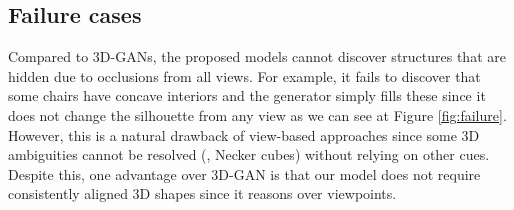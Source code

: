 \subsection{Failure cases} 
Compared to 3D-GANs, the proposed \prgan models cannot discover structures that are hidden
due to occlusions from all views. For example, it fails to discover that some chairs have concave interiors and the generator simply fills these since it does not change the silhouette from any view as we can see at Figure
\ref{fig:failure}. 
However, this is a natural drawback of view-based approaches since
some 3D ambiguities cannot be resolved (\eg, Necker cubes) without
relying on other cues. Despite this, one advantage over 3D-GAN is that
our model does not require consistently aligned 3D shapes since it
reasons over viewpoints.
